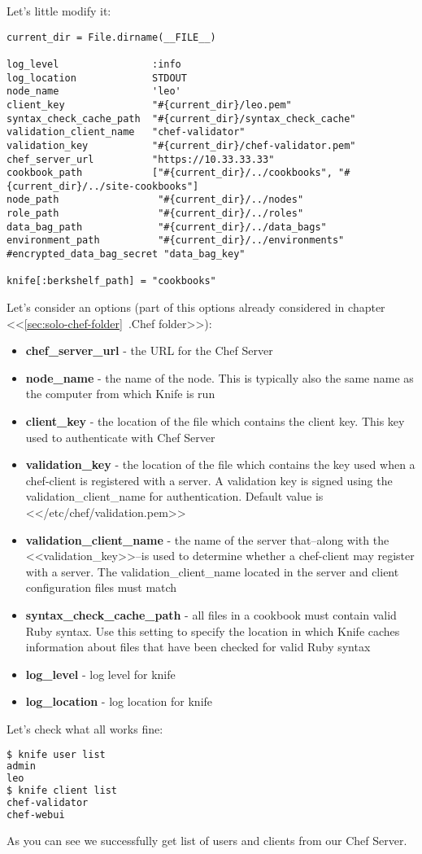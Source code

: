 Let's little modify it:

\begin{lstlisting}[label=lst:my-server-cloud-knife4,title=my-server-cloud/.chef/knife.rb]
current_dir = File.dirname(__FILE__)

log_level                :info
log_location             STDOUT
node_name                'leo'
client_key               "#{current_dir}/leo.pem"
syntax_check_cache_path  "#{current_dir}/syntax_check_cache"
validation_client_name   "chef-validator"
validation_key           "#{current_dir}/chef-validator.pem"
chef_server_url          "https://10.33.33.33"
cookbook_path            ["#{current_dir}/../cookbooks", "#{current_dir}/../site-cookbooks"]
node_path                 "#{current_dir}/../nodes"
role_path                 "#{current_dir}/../roles"
data_bag_path             "#{current_dir}/../data_bags"
environment_path          "#{current_dir}/../environments"
#encrypted_data_bag_secret "data_bag_key"

knife[:berkshelf_path] = "cookbooks"
\end{lstlisting}

Let's consider an options (part of this options already considered in chapter <<\ref{sec:solo-chef-folder}~.Chef folder>>):

\begin{itemize}
  \item \textbf{chef\_server\_url} - the URL for the Chef Server
  \item \textbf{node\_name} - the name of the node. This is typically also the same name as the computer from which Knife is run
  \item \textbf{client\_key} - the location of the file which contains the client key. This key used to authenticate with Chef Server
  \item \textbf{validation\_key} - the location of the file which contains the key used when a chef-client is registered with a server. A validation key is signed using the validation\_client\_name for authentication. Default value is <</etc/chef/validation.pem>>
  \item \textbf{validation\_client\_name} - the name of the server that–along with the <<validation\_key>>–is used to determine whether a chef-client may register with a server. The validation\_client\_name located in the server and client configuration files must match
  \item \textbf{syntax\_check\_cache\_path} - all files in a cookbook must contain valid Ruby syntax. Use this setting to specify the location in which Knife caches information about files that have been checked for valid Ruby syntax
  \item \textbf{log\_level} - log level for knife
  \item \textbf{log\_location} - log location for knife
\end{itemize}

Let's check what all works fine:

\begin{lstlisting}[language=Bash,label=lst:my-server-cloud-knife5]
$ knife user list
admin
leo
$ knife client list
chef-validator
chef-webui
\end{lstlisting}

As you can see we successfully get list of users and clients from our Chef Server.